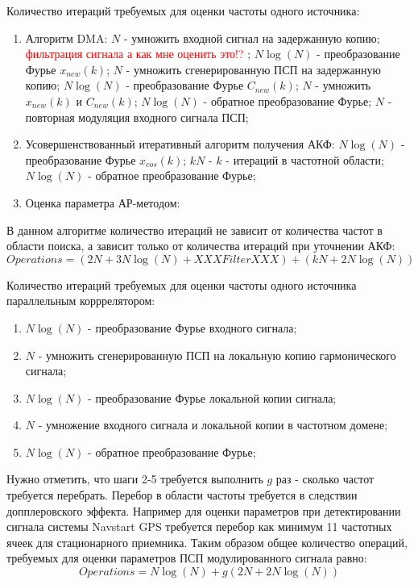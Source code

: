 Количество итераций требуемых для оценки частоты одного источника:
\begin{enumerate}
\item Алгоритм DMA:
	\subitem[1] ${N}$ - умножить входной сигнал на задержанную копию;
	\subitem[2] \textcolor{red}{фильтрация сигнала а как мне оценить это!?} ;
	\subitem[3] ${N \log (N)}$ - преобразование Фурье ${x_{new}(k)}$;
	\subitem[4] ${N}$ - умножить сгенерированную ПСП на задержанную копию;
	\subitem[5] ${N \log (N)}$ - преобразование Фурье ${C_{new}(k)}$;
	\subitem[6] ${N}$ - умножить ${x_{new}(k)}$ и ${C_{new}(k)}$;
	\subitem[7] ${N \log (N)}$ - обратное преобразование Фурье; 
	\subitem[8] ${N}$ - повторная модуляция входного сигнала ПСП;
\item Усовершенствованный итеративный алгоритм получения АКФ:
	\subitem[1] ${N \log (N)}$ - преобразование Фурье ${x_{cos}(k)}$;
	\subitem[2] ${kN}$ - ${k}$ - итераций в частотной области;
	\subitem[3] ${N \log (N)}$ - обратное преобразование Фурье;
\item Оценка параметра АР-методом:
\end{enumerate}

В данном алгоритме количество итераций не зависит от количества частот в области поиска,
а зависит только от количества итераций при уточнении  АКФ:
\begin{equation}
	Operations = \left( 2N + 3N \log (N) + XXXFilterXXX \right) + (kN + 2N \log (N)) 
\end{equation}

Количество итераций требуемых для оценки частоты одного источника параллельным корррелятором:
\begin{enumerate}
	\item ${N \log (N)}$ - преобразование Фурье входного сигнала;
	\item ${N}$ - умножить сгенерированную ПСП на локальную копию гармонического сигнала;
	\item ${N \log (N)}$ - преобразование Фурье локальной копии сигнала;
	\item ${N}$ - умножение входного сигнала и локальной копии в частотном домене;
	\item ${N \log (N)}$ - обратное преобразование Фурье;
\end{enumerate}

Нужно отметить, что шаги 2-5 требуется выполнить ${g}$ раз - сколько частот требуется перебрать.
Перебор в области частоты требуется в следствии допплеровского эффекта. Например для оценки 
параметров при детектировании сигнала системы Navstart GPS требуется перебор как минимум
11 частотных ячеек для стационарного приемника.
Таким образом общее количество операций, требуемых для оценки параметров ПСП модулированного
сигнала равно:
\begin{equation}
	Operations = N \log (N) + g(2N + 2N \log (N)) 
\end{equation}

